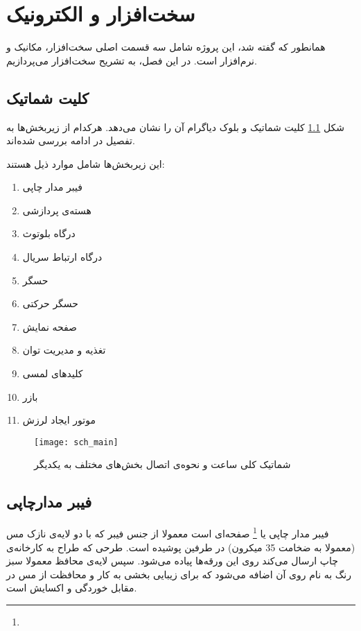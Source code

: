 \chapter{سخت‌افزار و الکترونیک}

همانطور که گفته شد، این پروژه شامل سه قسمت اصلی سخت‌افزار، مکانیک و نرم‌افزار است. در این فصل، به تشریح سخت‌افزار می‌پردازیم.

\section{کلیت شماتیک}
شکل \ref{fig:sch-all} کلیت شماتیک و بلوک دیاگرام آن را نشان می‌دهد. هرکدام از زیربخش‌ها به تفصیل در ادامه بررسی شده‌اند.

این زیربخش‌ها شامل موارد ذیل هستند:
\begin{multicols}{2}
\begin{enumerate}
	\item فیبر مدار چاپی
	\item هسته‌ی پردازشی
	\item درگاه بلوتوث
	\item درگاه ارتباط سریال
	\item حسگر 
	\item حسگر حرکتی
	\item صفحه نمایش
	\item تغذیه و مدیریت توان
	\item کلیدهای لمسی
	\item بازر
	\item موتور ایجاد لرزش
\end{enumerate}
\end{multicols}


\begin{figure}[h]
	\centering
	\texttt{[image: sch\_main]}
	\caption{شماتیک کلی ساعت و نحوه‌ی اتصال بخش‌های مختلف به یکدیگر}
	\label{fig:sch-all}
\end{figure}
\section{فیبر مدارچاپی}
	فیبر مدار چاپی یا \pcb\footnote{} صفحه‌ای است معمولا از جنس فیبر  که با دو لایه‌ی نازک مس (معمولا به ضخامت 35 میکرون) در طرفین پوشیده است. طرحی که طراح به کارخانه‌ی چاپ \pcbf ارسال می‌کند روی این ورقه‌ها پیاده می‌شود. سپس لایه‌ی محافظ معمولا سبز رنگ به نام  روی آن اضافه می‌شود که برای زیبایی بخشی به کار و محافظت از مس در مقابل خوردگی و اکسایش است.
	
